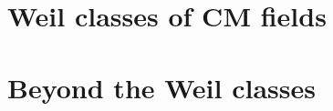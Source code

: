 \documentclass[11pt,reqno]{amsart}
\begin{document}
\part{Weil classes of CM fields}\label{part:cmfields}



\part{Beyond the Weil classes}\label{part:beyond}








\appendix
{}







\end{document}
